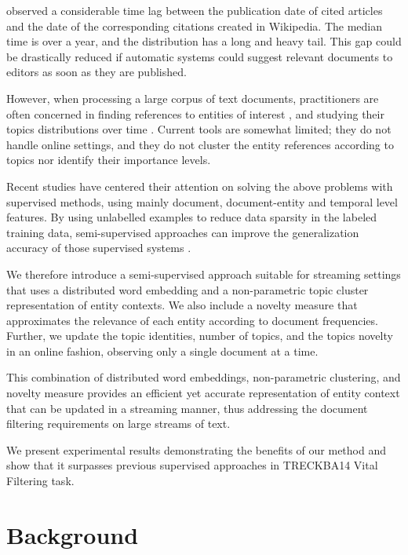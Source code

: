 \documentclass{article}
\begin{document}
\cite{frank12} observed a considerable time lag between the publication date of cited articles and the date of the corresponding citations created in Wikipedia. The median time is over a year, and the distribution has a long and heavy tail. This gap could be drastically reduced if automatic systems could suggest relevant documents to editors as soon as they are published.

However, when processing a large corpus of text documents, practitioners are often concerned in finding references to entities of interest \cite{RaoMD10, choi2007}, and studying their topics distributions over time \cite{blei12}. Current tools are somewhat limited; they do not handle online settings, and they do not cluster the entity references according to topics nor identify their importance levels.

Recent studies \cite{xitong13, bouvier13, efron13, zhang13, bellogin13} have centered their attention on solving the above problems with supervised methods, using mainly document, document-entity and temporal level features. By using unlabelled examples to reduce data sparsity in the labeled training data, semi-supervised approaches can improve the generalization accuracy of those supervised systems \cite{Turian10wordrepresentations}.

We therefore introduce a semi-supervised approach suitable for streaming settings that uses a distributed word embedding and a non-parametric topic cluster representation of entity contexts. We also include a novelty measure that approximates the relevance of each entity according to document frequencies. Further, we update the topic identities, number of topics, and the topics novelty in an online fashion, observing only a single document at a time.

This combination of distributed word embeddings, non-parametric clustering, and novelty measure provides an efficient yet accurate representation of entity context that can be updated in a streaming manner, thus addressing the document filtering requirements on large streams of text.

We present experimental results demonstrating the benefits of our method and show that it surpasses previous supervised approaches in TRECKBA14 Vital Filtering task.

\section{Background}
\label{background}
\end{document}
